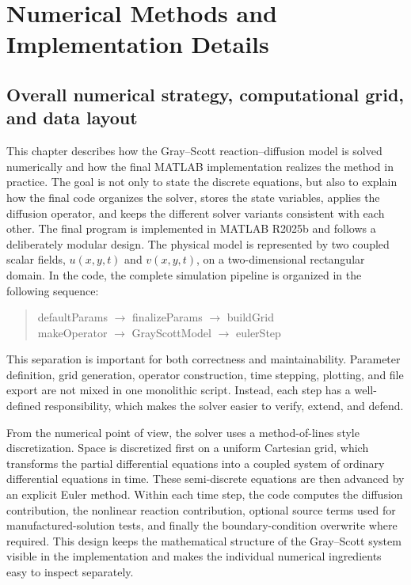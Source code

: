 \chapter{Numerical Methods and Implementation Details}

\section{Overall numerical strategy, computational grid, and data layout}
\label{sec:numimpl_overview_grid}

This chapter describes how the Gray--Scott reaction--diffusion model is solved numerically and how the final MATLAB implementation realizes the method in practice. The goal is not only to state the discrete equations, but also to explain how the final code organizes the solver, stores the state variables, applies the diffusion operator, and keeps the different solver variants consistent with each other.
The final program is implemented in MATLAB R2025b and follows a deliberately modular design. The physical model is represented by two coupled scalar fields, $u(x,y,t)$ and $v(x,y,t)$, on a two-dimensional rectangular domain. In the code, the complete simulation pipeline is organized in the following sequence:
\begin{quote}
\small\ttfamily
defaultParams $\rightarrow$ finalizeParams $\rightarrow$ buildGrid\\
makeOperator $\rightarrow$ GrayScottModel $\rightarrow$ eulerStep
\end{quote}
This separation is important for both correctness and maintainability. Parameter definition, grid generation, operator construction, time stepping, plotting, and file export are not mixed in one monolithic script. Instead, each step has a well-defined responsibility, which makes the solver easier to verify, extend, and defend.

From the numerical point of view, the solver uses a method-of-lines style discretization. Space is discretized first on a uniform Cartesian grid, which transforms the partial differential equations into a coupled system of ordinary differential equations in time. These semi-discrete equations are then advanced by an explicit Euler method. Within each time step, the code computes the diffusion contribution, the nonlinear reaction contribution, optional source terms used for manufactured-solution tests, and finally the boundary-condition overwrite where required. This design keeps the mathematical structure of the Gray--Scott system visible in the implementation and makes the individual numerical ingredients easy to inspect separately.

